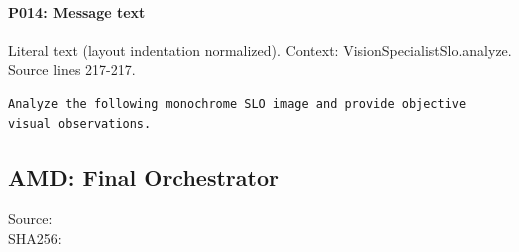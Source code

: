 \documentclass[10pt]{article}
\begin{document}
\paragraph{P014: Message text}
Literal text (layout indentation normalized). Context: VisionSpecialistSlo.analyze. Source lines 217-217.
\begin{Verbatim}
Analyze the following monochrome SLO image and provide objective visual observations.
\end{Verbatim}
\subsection{AMD: Final Orchestrator}
Source: \\
SHA256: {\scriptsize{}}
\end{document}
